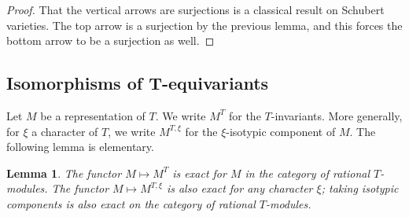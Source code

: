 \documentclass[12pt,reqno]{amsart}
\newtheorem{proposition}[theorem]{Proposition}
\newtheorem{lemma}[theorem]{Lemma}
\theoremstyle{definition}
\begin{document}
\begin{proof}
That the vertical arrows are surjections is a classical result on Schubert varieties. The top arrow is a surjection by the previous lemma, and this forces the bottom arrow to be a surjection as well.
\end{proof}

\subsection{Isomorphisms of T-equivariants}
Let $M$ be a representation of $T$. We write $M^T$ for the $T$-invariants. More generally, for $\xi$ a character of $T$, we write $M^{T, \xi}$ for the $\xi$-isotypic component of $M$. The following lemma is elementary.

\begin{lemma} \label{InvExact}
The functor $M \mapsto M^T$ is exact for $M$ in the category of rational $T$- modules. The functor $M \mapsto M^{T, \xi}$ is also exact for any character $\xi$; taking isotypic components is also exact on the category of rational $T$-modules.
\end{lemma}




\end{document}
